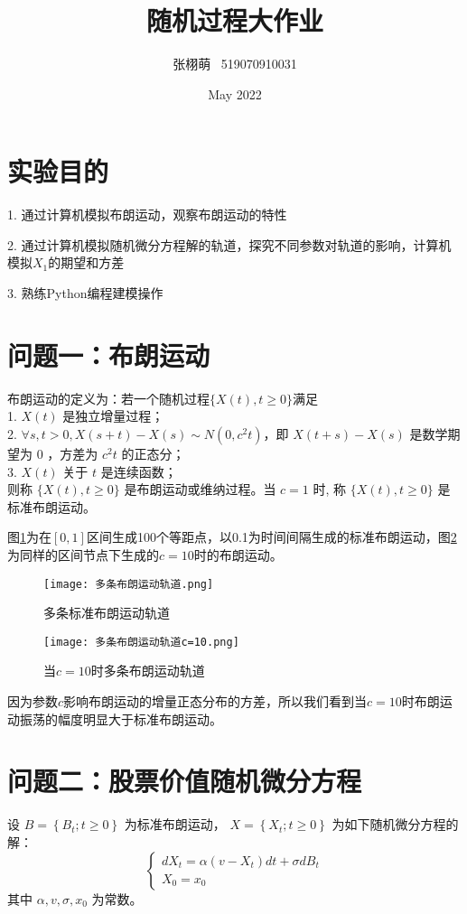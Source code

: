 \documentclass{article}
\title{随机过程大作业}
\author{张栩萌 \ 519070910031}
\date{May 2022}
\begin{document}
\maketitle

\section{实验目的}
1. 通过计算机模拟布朗运动，观察布朗运动的特性

2. 通过计算机模拟随机微分方程解的轨道，探究不同参数对轨道的影响，计算机模拟$X_1$的期望和方差

3. 熟练Python编程建模操作




\section{问题一：布朗运动}
布朗运动的定义为：若一个随机过程$\{X(t), t \ge 0\}$满足\\
1. $X(t)$ 是独立增量过程；\\
2. $\forall s, t>0, X(s+t)-X(s) \sim N\left(0, c^{2} t\right)$，即 $X(t+s)-X(s)$ 是数学期望为 0 ，方差为 $c^{2} t$ 的正态分；\\
3. $X(t)$ 关于 $t$ 是连续函数；\\
则称 $\{X(t), t \ge 0\}$ 是布朗运动或维纳过程。当 $c=1$ 时, 称 $\{X(t), t \ge 0\}$ 是标准布朗运动。

图\ref{fig:brown1}为在$[0, 1]$区间生成100个等距点，以0.1为时间间隔生成的标准布朗运动，图\ref{fig:brown1_10}为同样的区间节点下生成的$c=10$时的布朗运动。

\begin{figure}[H]
    \centering
    \texttt{[image: 多条布朗运动轨道.png]}
    \caption{多条标准布朗运动轨道}
    \label{fig:brown1}
    \end{figure}

\begin{figure}[H]
    \centering
    \texttt{[image: 多条布朗运动轨道c=10.png]}
    \caption{当$c=10$时多条布朗运动轨道}
    \label{fig:brown1_10}
    \end{figure}

因为参数$c$影响布朗运动的增量正态分布的方差，所以我们看到当$c=10$时布朗运动振荡的幅度明显大于标准布朗运动。




\section{问题二：股票价值随机微分方程}
设 $B=\left\{B_{t} ; t \geq 0\right\}$ 为标准布朗运动， $X=\left\{X_{t} ; t \geq 0\right\}$ 为如下随机微分方程的解：
$$
\left\{\begin{array}{l}
d X_{t}=\alpha\left(v-X_{t}\right) d t+\sigma d B_{t} \\
X_{0}=x_{0}
\end{array}\right.
$$
其中 $\alpha, v, \sigma, x_{0}$ 为常数。
\end{document}
